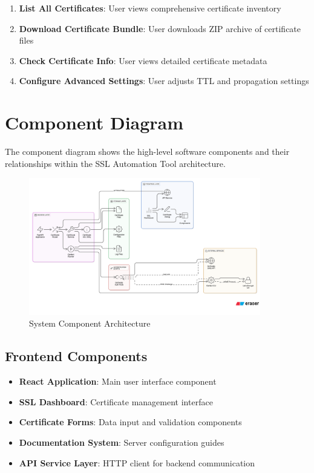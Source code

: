 \begin{enumerate}
    \item \textbf{List All Certificates}: User views comprehensive certificate inventory
    \item \textbf{Download Certificate Bundle}: User downloads ZIP archive of certificate files
    \item \textbf{Check Certificate Info}: User views detailed certificate metadata
    \item \textbf{Configure Advanced Settings}: User adjusts TTL and propagation settings
\end{enumerate}

\section{Component Diagram}

The component diagram shows the high-level software components and their relationships within the SSL Automation Tool architecture.

\begin{figure}[h]
\centering
\includegraphics[width=0.9\textwidth]{diagram-images/3.4-component-diagram.png}
\caption{System Component Architecture}
\label{fig:component-diagram}
\end{figure}

\subsection{Frontend Components}

\begin{itemize}
    \item \textbf{React Application}: Main user interface component
    \item \textbf{SSL Dashboard}: Certificate management interface
    \item \textbf{Certificate Forms}: Data input and validation components
    \item \textbf{Documentation System}: Server configuration guides
    \item \textbf{API Service Layer}: HTTP client for backend communication
\end{itemize}

